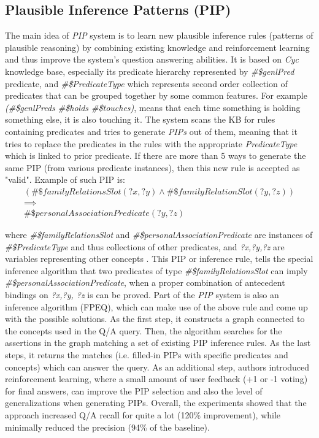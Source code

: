 \subsection {Plausible Inference Patterns (PIP)}
\label{section:rw_PIP}
The main idea of \emph{PIP} system is to learn new plausible inference rules 
(patterns of plausible reasoning) by combining existing knowledge and 
reinforcement learning and thus improve the system's question answering
abilities\parencite{Sharma2010}. It is based on \emph{Cyc} knowledge base,
especially its predicate hierarchy represented by \emph{\#\$genlPred} predicate, 
and \emph{\#\$PredicateType} which represents second order collection of predicates 
that can be grouped together by some common features. For example
\emph{(\#\$genlPreds \#\$holds \#\$touches)}, means that each time something is 
holding something else, it is also touching it. The system scans the KB for rules 
containing predicates and tries to generate \emph{PIPs} out of them, meaning
that it tries to replace the predicates in the rules with the appropriate
\emph{PredicateType} which is linked to prior predicate. If there are more
than 5 ways to generate the same PIP (from various predicate instances), then
this new rule is accepted as "valid". Example of such PIP is:
\begin{gather*}
(\#\$familyRelationsSlot(?x,?y) \land \#\$familyRelationSlot(?y,?z)) \\
\implies \\ 
\#\$personalAssociationPredicate(?y,?z)
\end{gather*}

where \emph{\#\$familyRelationsSlot} and \emph{\#\$personalAssociationPredicate}
are instances of \emph{\#\$PredicateType} and thus collections of other 
predicates, and \emph{?x,?y,?z} are variables representing other concepts
\parencite{Sharma2010}. This PIP or inference rule, tells the special inference
algorithm that two predicates of type \emph{\#\$familyRelationsSlot} can
imply \emph{\#\$personalAssociationPredicate}, when a proper combination
of antecedent bindings on \emph{?x,?y, ?z} is can be proved. Part of the 
\emph{PIP} system is also an inference algorithm (FPEQ), which can make use of 
the above rule and come up with the possible solutions. As the first step, it 
constructs a graph connected to the concepts used in the Q/A query. Then, the
algorithm searches for the assertions in the graph matching a set of existing
PIP inference rules. As the last steps, it returns the matches (i.e. filled-in
PIPs with specific predicates and concepts) which can answer the query.
As an additional step, authors introduced reinforcement learning, where a small
amount of user feedback (+1 or -1 voting) for final answers, can improve the
PIP selection and also the level of generalizations when generating PIPs.
Overall, the experiments showed that the approach increased Q/A recall for 
quite a lot (120\% improvement), while minimally reduced the precision (94\% of
the baseline)\parencite{Zang2013}.

